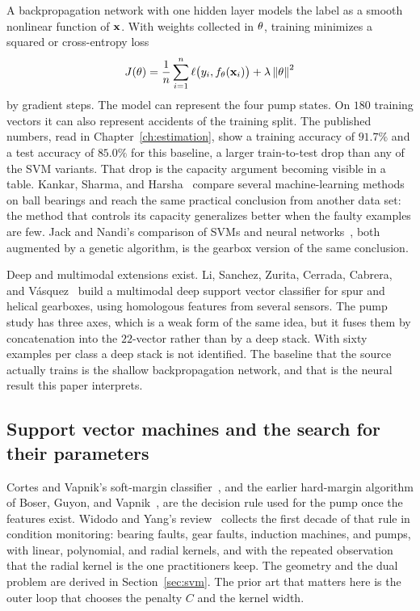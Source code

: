 A backpropagation network with one hidden layer models the label as a smooth nonlinear function of \(\mathbf{x}\).
With weights collected in \(\mathbf{\theta}\), training minimizes a squared or cross-entropy loss
\begin{equation}
J(\mathbf{\theta})=\frac{1}{n}\sum_{i=1}^{n} \ell\bigl(y_{i}, f_{\mathbf{\theta}}(\mathbf{x}_{i})\bigr)+\lambda\left\lVert \mathbf{\theta} \right\rVert^{2}
\label{eq:bpnn}
\end{equation}
by gradient steps.
The model can represent the four pump states.
On \(180\) training vectors it can also represent accidents of the training split.
The published numbers, read in Chapter~\ref{ch:estimation}, show a training accuracy of \(91.7\%\) and a test accuracy of \(85.0\%\) for this baseline, a larger train-to-test drop than any of the SVM variants.
That drop is the capacity argument becoming visible in a table.
Kankar, Sharma, and Harsha~\cite{kankar2011} compare several machine-learning methods on ball bearings and reach the same practical conclusion from another data set: the method that controls its capacity generalizes better when the faulty examples are few.
Jack and Nandi's comparison of SVMs and neural networks~\cite{jack2002}, both augmented by a genetic algorithm, is the gearbox version of the same conclusion.

Deep and multimodal extensions exist.
Li, Sanchez, Zurita, Cerrada, Cabrera, and Vásquez~\cite{li2015deep} build a multimodal deep support vector classifier for spur and helical gearboxes, using homologous features from several sensors.
The pump study has three axes, which is a weak form of the same idea, but it fuses them by concatenation into the \(22\)-vector rather than by a deep stack.
With sixty examples per class a deep stack is not identified.
The baseline that the source actually trains is the shallow backpropagation network, and that is the neural result this paper interprets.

\subsection{Support vector machines and the search for their parameters}

Cortes and Vapnik's soft-margin classifier~\cite{cortes1995}, and the earlier hard-margin algorithm of Boser, Guyon, and Vapnik~\cite{boser1992}, are the decision rule used for the pump once the features exist.
Widodo and Yang's review~\cite{widodo2007,lei2008} collects the first decade of that rule in condition monitoring: bearing faults, gear faults, induction machines, and pumps, with linear, polynomial, and radial kernels, and with the repeated observation that the radial kernel is the one practitioners keep.
The geometry and the dual problem are derived in Section~\ref{sec:svm}.
The prior art that matters here is the outer loop that chooses the penalty \(C\) and the kernel width.

